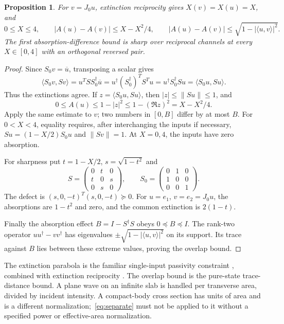 \documentclass[11pt,a4paper]{article}
\newtheorem{proposition}[theorem]{Proposition}
\theoremstyle{remark}
\newcommand{\norm}[1]{\lVert #1\rVert}
\newcommand{\abs}[1]{\lvert #1\rvert}
\newcommand{\ip}[2]{\langle #1,#2\rangle}
\begin{document}
\begin{proposition}\label{prop:channel-basic}
For $v=J_0u$, extinction reciprocity gives $X(v)=X(u)=X$, and
\begin{equation}\label{eq:separate}
 0\leq X\leq4,\qquad
 \abs{A(u)-A(v)}\leq X-X^2/4,\qquad
 \abs{A(u)-A(v)}\leq\sqrt{1-\abs{\ip uv}^2}.
\end{equation}
The first absorption-difference bound is sharp over reciprocal channels at every $X\in[0,4]$ with an orthogonal reversed pair.
\end{proposition}
\begin{proof}
Since $S_0v=\overline u$, transposing a scalar gives
\[
 \ip{S_0v}{Sv}=u^TSS_0^\dagger\overline u
 =u^\dagger(S_0^\dagger)^TS^Tu
 =u^\dagger S_0^\dagger Su=\ip{S_0u}{Su}.
\]
Thus the extinctions agree. If $z=\ip{S_0u}{Su}$, then $\abs z\leq\norm{Su}\leq1$, and
\[
 0\leq A(u)\leq1-\abs z^2\leq1-(\Re z)^2=X-X^2/4.
\]
Apply the same estimate to $v$; two numbers in $[0,B]$ differ by at most $B$. For $0<X<4$, equality requires, after interchanging the inputs if necessary, $Su=(1-X/2)S_0u$ and $\norm{Sv}=1$. At $X=0,4$, the inputs have zero absorption.

For sharpness put $t=1-X/2$, $s=\sqrt{1-t^2}$ and
\[
 S=\begin{pmatrix}0&t&0\\t&0&s\\0&s&0\end{pmatrix},\qquad
 S_0=\begin{pmatrix}0&1&0\\1&0&0\\0&0&1\end{pmatrix}.
\]
The defect is $(s,0,-t)^T(s,0,-t)\succeq0$. For $u=e_1$, $v=e_2=J_0u$, the absorptions are $1-t^2$ and zero, and the common extinction is $2(1-t)$.

Finally the absorption effect $B=I-S^\dagger S$ obeys $0\preceq B\preceq I$. The rank-two operator $uu^\dagger-vv^\dagger$ has eigenvalues $\pm\sqrt{1-\abs{\ip uv}^2}$ on its support. Its trace against $B$ lies between these extreme values, proving the overlap bound.
\end{proof}

The extinction parabola is the familiar single-input passivity constraint \citep{Fleury2014}, combined with extinction reciprocity \citep{SounasAlu2014}. The overlap bound is the pure-state trace-distance bound. A plane wave on an infinite slab is handled per transverse area, divided by incident intensity. A compact-body cross section has units of area and is a different normalization;~\eqref{eq:separate} must not be applied to it without a specified power or effective-area normalization.
\end{document}
